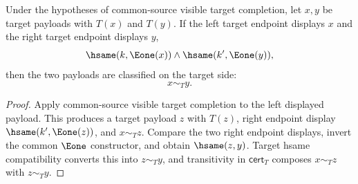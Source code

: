 \begin{theorem}
\label{thm:tagged-option-maprel-common-source-visible-target-payload-classification}
Under the hypotheses of common-source visible target completion, let $x,y$ be
target payloads with $T(x)$ and $T(y)$. If the left target endpoint displays
$x$ and the right target endpoint displays $y$,
$$
\hsame(k,\Eone(x))\land\hsame(k',\Eone(y)),
$$
then the two payloads are classified on the target side:
$$
x\sim_T y.
$$
\end{theorem}
\begin{proof}
Apply common-source visible target completion to the left displayed payload.
This produces a target payload $z$ with $T(z)$, right endpoint display
$\hsame(k',\Eone(z))$, and $x\sim_T z$. Compare the two right endpoint
displays, invert the common $\Eone$ constructor, and obtain $\hsame(z,y)$.
Target hsame compatibility converts this into $z\sim_T y$, and transitivity in
$\mathsf{cert}_T$ composes $x\sim_T z$ with $z\sim_T y$.
\end{proof}

